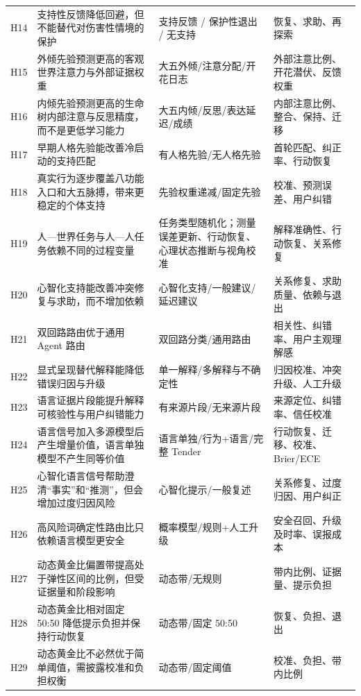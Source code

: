 \documentclass[UTF8,a4paper,11pt]{ctexart}
\begin{document}
\begin{center}
\begin{longtable}{@{}p{1.4cm}p{4.5cm}p{5.2cm}p{3.4cm}@{}}
H14 & 支持性反馈降低回避，但不能替代对伤害性情境的保护 & 支持反馈 / 保护性退出 / 无支持 & 恢复、求助、再探索 \\
H15 & 外倾先验预测更高的客观世界注意力与外部证据权重 & 大五外倾/注意分配/开花日志 & 外部注意比例、开花潜伏、反馈权重 \\
H16 & 内倾先验预测更高的生命树内部注意与反思精度，而不是更低学习能力 & 大五内倾/反思/表达延迟/成绩 & 内部注意比例、整合、保持、迁移 \\
H17 & 早期人格先验能改善冷启动的支持匹配 & 有人格先验/无人格先验 & 首轮匹配、纠正率、行动恢复 \\
H18 & 真实行为逐步覆盖八功能入口和大五脉搏，带来更稳定的个体支持 & 先验权重递减/固定先验 & 校准、预测误差、用户纠错 \\
H19 & 人—世界任务与人—人任务依赖不同的过程变量 & 任务类型随机化；测量误差更新、行动恢复、心理状态推断与视角校准 & 解释准确性、行动恢复、关系修复 \\
H20 & 心智化支持能改善冲突修复与求助，而不增加依赖 & 心智化支持/一般建议/延迟建议 & 关系修复、求助质量、依赖与退出 \\
H21 & 双回路路由优于通用 Agent 路由 & 双回路分类/通用路由 & 相关性、纠错率、用户主观理解感 \\
H22 & 显式呈现替代解释能降低错误归因与升级 & 单一解释/多解释与不确定性 & 归因校准、冲突升级、人工升级 \\
H23 & 语言证据片段能提升解释可核验性与用户纠错能力 & 有来源片段/无来源片段 & 来源定位、纠错率、信任校准 \\
H24 & 语言信号加入多源模型后产生增量价值，语言单独模型不产生同等价值 & 语言单独/行为+语言/完整 Tender & 行动恢复、迁移、校准、Brier/ECE \\
H25 & 心智化语言信号帮助澄清“事实”和“推测”，但会增加过度归因风险 & 心智化提示/一般复述 & 关系修复、过度归因、用户纠正 \\
H26 & 高风险词确定性路由比只依赖语言模型更安全 & 概率模型/规则+人工升级 & 安全召回、升级及时率、误报成本 \\
H27 & 动态黄金比偏置带提高处于弹性区间的比例，但受证据量和阶段影响 & 动态带/无规则 & 带内比例、证据量、提示负担 \\
H28 & 动态黄金比相对固定 50:50 降低提示负担并保持行动恢复 & 动态带/固定 50:50 & 恢复、负担、退出 \\
H29 & 动态黄金比不必然优于简单阈值，需披露校准和负担权衡 & 动态带/固定阈值 & 校准、负担、带内比例 \\
\bottomrule
\end{longtable}
\end{center}
\end{document}
